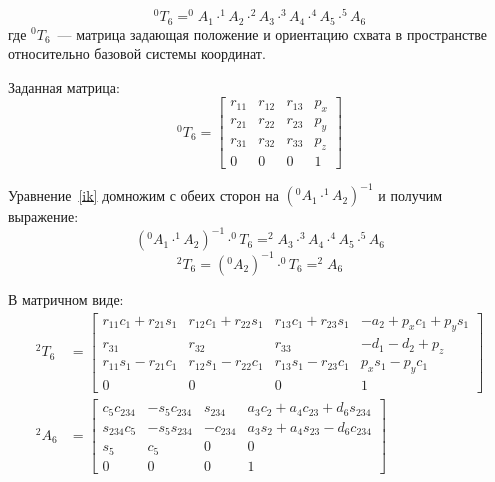 \begin{equation}\label{ik}
	^0T_6 = ^0A_1 \cdot ^1A_2 \cdot ^2A_3 \cdot ^3A_4 \cdot ^4A_5 \cdot ^5A_6
\end{equation}
где $^0T_6$~--- матрица задающая положение и ориентацию схвата в пространстве относительно базовой системы координат.

Заданная матрица:
\begin{equation}
	^0T_6 = 
	\left[\begin{matrix}r_{11} & r_{12} & r_{13} & p_{x}\\r_{21} & r_{22} & r_{23} & p_{y}\\r_{31} & r_{32} & r_{33} & p_{z}\\0 & 0 & 0 & 1\end{matrix}\right]
\end{equation}

Уравнение~\eqref{ik} домножим с обеих сторон на $(^0A_1 \cdot ^1A_2)^{-1}$ и получим выражение:
\begin{equation}
	(^0A_1 \cdot ^1A_2)^{-1} \cdot ^0T_6 = ^2A_3 \cdot ^3A_4 \cdot ^4A_5 \cdot ^5A_6
\end{equation}
\begin{equation}
^2T_6 = (^0A_2)^{-1} \cdot ^0T_6 = ^2A_6
\end{equation}

В матричном виде:
\begin{align*}
	^2T_6 &= 
	\left[\begin{matrix}
		r_{11} c_{1} + r_{21} s_{1} & r_{12} c_{1} + r_{22} s_{1} & r_{13} c_{1} + r_{23} s_{1} & - a_{2} + p_{x} c_{1} + p_{y} s_{1}\\
		r_{31} & r_{32} & r_{33} & - d_{1} - d_{2} + p_{z}\\
		r_{11} s_{1} - r_{21} c_{1} & r_{12} s_{1} - r_{22} c_{1} & r_{13} s_{1} - r_{23} c_{1} & p_{x} s_{1} - p_{y} c_{1}\\
		0 & 0 & 0 & 1\end{matrix}\right]\\
	^2A_6 &=
	\left[\begin{matrix}
		c_{5} c_{234} & - s_{5} c_{234} & s_{234} & a_{3} c_{2} + a_{4} c_{23} + d_{6} s_{234}\\
		s_{234} c_{5} & - s_{5} s_{234} & - c_{234} & a_{3} s_{2} + a_{4} s_{23} - d_{6} c_{234}\\
		s_{5} & c_{5} & 0 & 0\\
		0 & 0 & 0 & 1
	\end{matrix}\right]
\end{align*}

